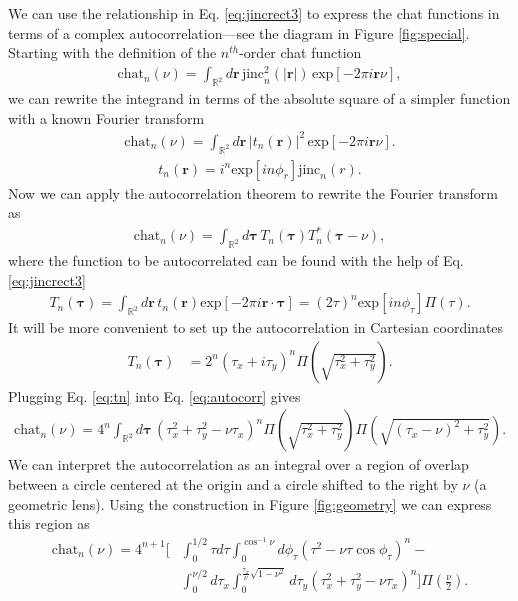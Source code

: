 \documentclass[]{osa-article}
\providecommand{\mb}[1]{\mathbf{#1}}
\providecommand{\mbb}[1]{\mathbb{#1}}
\providecommand{\bs}[1]{\boldsymbol{#1}}
\begin{document}
We can use the relationship in Eq. \ref{eq:jincrect3} to express the chat
functions in terms of a complex autocorrelation---see the diagram in Figure \ref{fig:special}. Starting with the definition of
the $n^{th}$-order chat function
\begin{align}
  \text{chat}_{n}(\nu) = \int_{\mbb{R}^2}d\mb{r}\, \text{jinc}_{n}^2(|\mb{r}|)\, \text{exp}\left[-2\pi i\mb{r}\nu\right],  \label{eq:ftA}
\end{align}
we can rewrite the integrand in terms of the absolute square of a simpler
function with a known Fourier transform
\begin{align}
  \text{chat}_{n}(\nu) = \int_{\mbb{R}^2}d\mb{r}\, |t_n(\mb{r})|^2\, \text{exp}\left[-2\pi i\mb{r}\nu\right].  \label{eq:ftB}
\end{align}
\begin{align}
  t_n(\mb{r}) = i^n\text{exp}[in\phi_r]\text{jinc}_{n}(r).
\end{align}
Now we can apply the autocorrelation theorem to rewrite the Fourier transform as
\begin{align}
  \text{chat}_{n}(\nu) = \int_{\mbb{R}^2}d\bs{\tau}\, T_n(\bs{\tau})T^*_n(\bs{\tau} - \nu), \label{eq:autocorr}
\end{align}
where the function to be autocorrelated can be found with the help of Eq. \ref{eq:jincrect3}
\begin{align}
  T_n(\bs{\tau}) = \int_{\mbb{R}^2}d\mb{r}\, t_n(\mb{r})\text{exp}\left[-2\pi i\mb{r}\cdot\bs{\tau}\right] = (2\tau)^n\text{exp}[in\phi_\tau]\Pi\left(\tau\right). \label{eq:tau}
\end{align}
It will be more convenient to set up the autocorrelation in Cartesian coordinates 
\begin{align}
  T_n(\bs{\tau}) &= 2^n(\tau_x + i\tau_y)^{n}\Pi\left(\sqrt{\tau_x^2 + \tau_y^2}\right). \label{eq:tn}
\end{align}
Plugging Eq. \ref{eq:tn} into Eq. \ref{eq:autocorr} gives
\begin{align}
  \text{chat}_{n}(\nu) = 4^n\int_{\mbb{R}^2}d\bs{\tau}\, (\tau_x^2 + \tau_y^2 - \nu\tau_x)^{n}\Pi\left(\sqrt{\tau_x^2 + \tau_y^2}\right)\Pi\left(\sqrt{(\tau_x - \nu)^2 + \tau_y^2}\right).
\end{align}
We can interpret the autocorrelation as an integral over a region of overlap
between a circle centered at the origin and a circle shifted to the right by
$\nu$ (a geometric lens). Using the construction in Figure \ref{fig:geometry} we
can express this region as
\begin{align}
  \text{chat}_{n}(\nu) = 4^{n+1}\Bigg[&\int_0^{1/2}\tau d\tau\int_0^{\cos^{-1}\nu}d\phi_{\tau}(\tau^2 - \nu\tau\cos\phi_{\tau})^{n} -\nonumber \\ &\int_{0}^{\nu/2}d\tau_x\int_0^{\frac{\tau_x}{\nu}\sqrt{1 - \nu^2}}d\tau_y(\tau_x^2 + \tau_y^2 - \nu\tau_x)^{n}\Bigg]\Pi\left(\frac{\nu}{2}\right).
\end{align}
\end{document}
